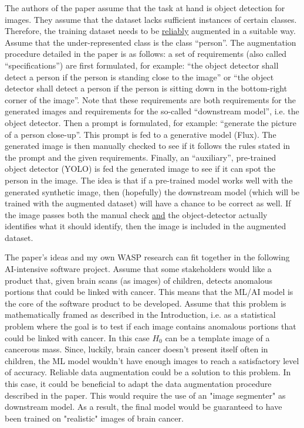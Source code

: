 The authors of the paper assume that the task at hand is object detection for images. They assume that the dataset lacks sufficient instances of certain classes. Therefore, the training dataset needs to be \underline{reliably} augmented in a suitable way. Assume that the under-represented class is the class “person”. The augmentation procedure detailed in the paper is as follows: a set of requirements (also called “specifications”) are first formulated, for example: “the object detector shall detect a person if the person is standing close to the image” or “the object detector shall detect a person if the person is sitting down in the bottom-right corner of the image”. Note that these requirements are both requirements for the generated images and requirements for the so-called “downstream model”, i.e. the object detector. Then a prompt is formulated, for example: “generate the picture of a person close-up”. This prompt is fed to a generative model (Flux). The generated image is then manually checked to see if it follows the rules stated in the prompt and the given requirements. Finally, an “auxiliary”, pre-trained object detector (YOLO) is fed the generated image to see if it can spot the person in the image. The idea is that if a pre-trained model works well with the generated synthetic image, then (hopefully) the downstream model (which will be trained with the augmented dataset) will have a chance to be correct as well. If the image passes both the manual check \underline{and} the object-detector actually identifies what it should identify, then the image is included in the augmented dataset.%

The paper’s ideas and my own WASP research can fit together in the following AI-intensive software project. Assume that some stakeholders would like a product that, given brain scans (as images) of children, detects anomalous portions that could be linked with cancer. This means that the ML/AI model is the core of the software product to be developed. Assume that this problem is mathematically framed as described in the Introduction, i.e. as a statistical problem where the goal is to test if each image contains anomalous portions that could be linked with cancer. In this case $H_0$ can be a template image of a cancerous mass. Since, luckily, brain cancer doesn't present itself often in children, the ML model wouldn't have enough images to reach a satisfactory level of accuracy. Reliable data augmentation could be a solution to this problem. In this case, it could be beneficial to adapt the data augmentation procedure described in the paper. This would require the use of an "image segmenter" as downstream model. As a result, the final model would be guaranteed to have been trained on "realistic" images of brain cancer. %

